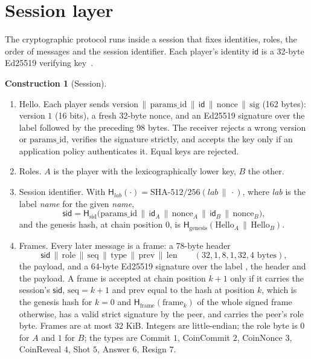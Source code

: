 \documentclass[11pt]{article}
\theoremstyle{definition}
\newtheorem{construction}[lemma]{Construction}
\theoremstyle{remark}
\newcommand{\sid}{\mathsf{sid}}
\newcommand{\id}{\mathsf{id}}
\begin{document}
\section{Session layer}\label{sec:session}
The cryptographic protocol runs inside a session that fixes identities, roles, the order of messages and the session identifier. Each player's identity $\id$ is a 32-byte Ed25519 verifying key~\cite{ed25519}.

\begin{construction}[Session]\label{con:session}
\begin{enumerate}[label=S\arabic*.]
  \item Hello. Each player sends $\mathrm{version}\,\|\,\mathrm{params\_id}\,\|\,\id\,\|\,\mathrm{nonce}\,\|\,\mathrm{sig}$ (162 bytes): version $1$ (16 bits), a fresh 32-byte nonce, and an Ed25519 signature over the label  followed by the preceding 98 bytes. The receiver rejects a wrong version or $\mathrm{params\_id}$, verifies the signature strictly, and accepts the key only if an application policy authenticates it. Equal keys are rejected.
  \item Roles. $A$ is the player with the lexicographically lower key, $B$ the other.
  \item Session identifier. With $\mathsf H_{\textit{lab}}(\cdot)=\text{SHA-512/256}(\textit{lab}\,\|\,\cdot)$, where \textit{lab} is the label \textit{name} for the given \textit{name},
  \[
    \sid=\mathsf H_{\mathrm{sid}}\bigl(\mathrm{params\_id}\,\|\,\id_A\,\|\,\mathrm{nonce}_A\,\|\,\id_B\,\|\,\mathrm{nonce}_B\bigr),
  \]
  and the genesis hash, at chain position $0$, is $\mathsf H_{\mathrm{genesis}}(\mathrm{Hello}_A\,\|\,\mathrm{Hello}_B)$.
  \item Frames. Every later message is a frame: a 78-byte header
  \[
    \sid\,\|\,\mathrm{role}\,\|\,\mathrm{seq}\,\|\,\mathrm{type}\,\|\,\mathrm{prev}\,\|\,\mathrm{len}\qquad(32,1,8,1,32,4\text{ bytes}),
  \]
  the payload, and a 64-byte Ed25519 signature over the label , the header and the payload. A frame is accepted at chain position $k+1$ only if it carries the session's $\sid$, $\mathrm{seq}=k+1$ and $\mathrm{prev}$ equal to the hash at position $k$, which is the genesis hash for $k=0$ and $\mathsf H_{\mathrm{frame}}(\mathrm{frame}_k)$ of the whole signed frame otherwise, has a valid strict signature by the peer, and carries the peer's role byte. Frames are at most 32 KiB. Integers are little-endian; the role byte is $0$ for $A$ and $1$ for $B$; the types are Commit $1$, CoinCommit $2$, CoinNonce $3$, CoinReveal $4$, Shot $5$, Answer $6$, Resign $7$.

\end{enumerate}
\end{construction}
\end{document}
